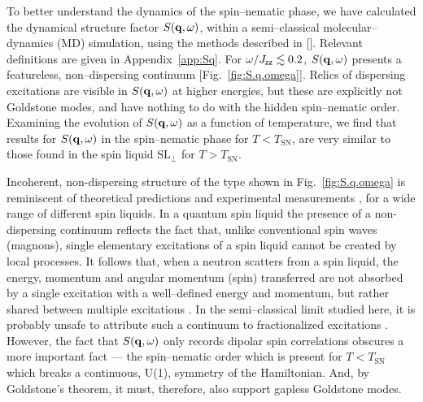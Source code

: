 \documentclass[apsrev4-1,prx,superscriptaddress,floatfix,twocolumn,longbibliography]{revtex4-1}
\begin{document}

To better understand the dynamics of the spin--nematic phase, we have calculated 
the dynamical structure factor $S({\bf q}, \omega)$, 
within a semi--classical molecular--dynamics (MD) simulation, 
using the methods described in [].   
%
Relevant definitions are given in Appendix~\ref{app:Sq}.   
%
For \mbox{$\omega/J_{\sf zz} \lesssim 0.2$}, $S({\bf q}, \omega)$ 
presents  a featureless, non--dispersing continuum [Fig.~\ref{fig:S.q.omega}].  
%
Relics of dispersing excitations are visible in $S({\bf q}, \omega)$ at higher 
energies, but these are explicitly not Goldstone modes, and have nothing to do 
with the hidden spin--nematic order.  
%
Examining the evolution of $S({\bf q}, \omega)$ as a function of temperature, 
we find that results for $S({\bf q}, \omega)$ in the spin--nematic phase for $T < T_\text{SN}$,   
are very similar to those found in the spin liquid $\text{SL}_\perp$ 
for $T > T_\text{SN}$.  


Incoherent, non-dispersing structure of the type shown in Fig.~\ref{fig:S.q.omega} 
is reminiscent of theoretical predictions \cite{knolle14,punk14, bieri15}
and experimental measurements \cite{han12,petit16-PRB94,paddison17}, 
for a wide range of different spin liquids.
%
In a quantum spin liquid the presence of a non-dispersing continuum reflects the 
fact that, unlike conventional spin waves (magnons), single elementary 
excitations of a spin liquid cannot be created by local processes.
%
It follows that, when a neutron scatters from a spin liquid, the energy, momentum 
and angular momentum (spin) transferred are not absorbed by a single excitation
with a well--defined energy and momentum, but rather shared between 
multiple excitations \cite{savary17-RPP80}.
%
In the semi--classical limit studied here, it is probably unsafe to 
attribute such a continuum to fractionalized 
excitations \cite{taillefumier-in-preparation}.
%
However, the fact that $S({\bf q}, \omega)$ only records dipolar spin correlations 
obscures a more important fact --- the spin--nematic order which 
is present for $T < T_\text{SN}$ which breaks a continuous, U(1), 
symmetry of the Hamiltonian.  
%
And, by Goldstone's theorem, 
it must, therefore, also support gapless Goldstone modes.

\end{document}
